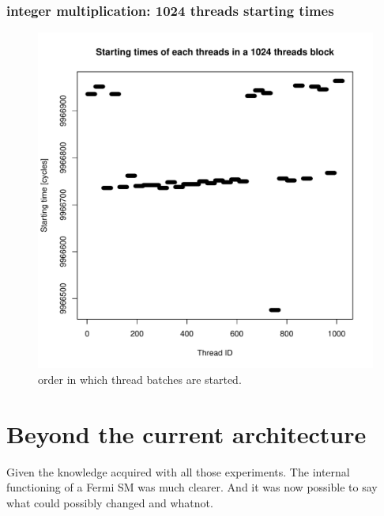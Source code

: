 \documentclass{report}
\def \scalingfactor{.8}
\begin{document}
	\subsection{integer multiplication: 1024 threads starting times}
    \begin{figure}[h]
    		\centering
		\vspace{-20pt}
	    	\includegraphics[width=\scalingfactor\linewidth]{"graphics/starting_times_ratio31"}
	    	\vspace{-15pt}
	    	\captionsetup{justification=centering}    
	    	\caption{order in which thread batches are started.}
    \end{figure}
\chapter{Beyond the current architecture}
    Given the knowledge acquired with all those experiments. The internal functioning of a Fermi SM was much clearer. And it was now possible to say what could possibly changed and whatnot.
\end{document}
